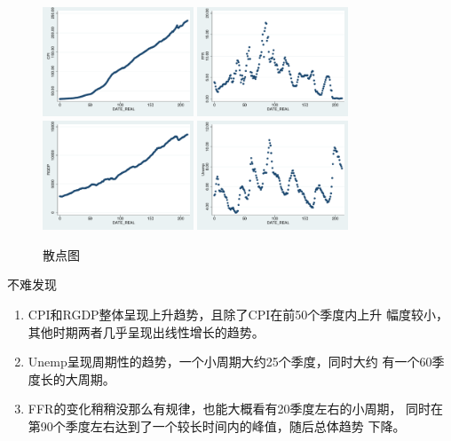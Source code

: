 \documentclass[cn]{homework}
\begin{document}
    \begin{figure}[h]
        \centering
        \includegraphics[width=0.4\textwidth]{CPI.pdf}
        \includegraphics[width=0.4\textwidth]{FFR.pdf}
        \includegraphics[width=0.4\textwidth]{RGDP.pdf}
        \includegraphics[width=0.4\textwidth]{Unemp.pdf}
        \caption{散点图}
    \end{figure}

    不难发现
    \begin{enumerate}
        \item 
        CPI和RGDP整体呈现上升趋势，且除了CPI在前50个季度内上升
        幅度较小，其他时期两者几乎呈现出线性增长的趋势。

        \item
        Unemp呈现周期性的趋势，一个小周期大约25个季度，同时大约
        有一个60季度长的大周期。

        \item
        FFR的变化稍稍没那么有规律，也能大概看有20季度左右的小周期，
        同时在第90个季度左右达到了一个较长时间内的峰值，随后总体趋势
        下降。

    \end{enumerate}
\end{document}
